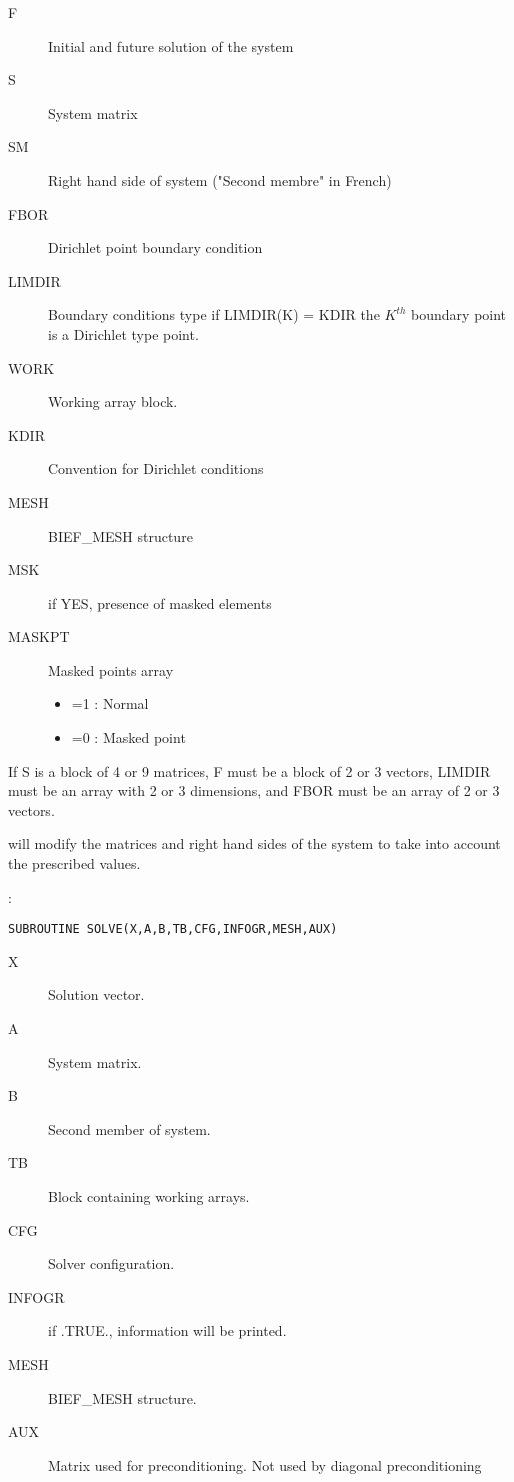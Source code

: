 \begin{description}
  \item [F] Initial and future solution of the system
  \item [S] System matrix
  \item [SM]    Right hand side of system ("Second membre" in French)
  \item [FBOR]  Dirichlet point boundary condition
  \item [LIMDIR] Boundary conditions type if LIMDIR(K) = KDIR the $K^{th}$
    boundary point is a Dirichlet type point.
  \item [WORK] Working array block.
  \item [KDIR] Convention for Dirichlet conditions
  \item [MESH] BIEF\_MESH structure
  \item [MSK] if YES, presence of masked elements
  \item [MASKPT] Masked points array
    \begin{itemize}
      \item =1 : Normal
      \item =0 : Masked point
    \end{itemize}
\end{description}

If S is a block of 4 or 9 matrices, F must be a block of 2 or 3 vectors, LIMDIR
must be an array with 2 or 3 dimensions, and FBOR must be an array of 2 or 3
vectors.

 will modify the matrices and right hand sides of the system to
take into account the prescribed values.

:
\begin{lstlisting}[language=TelFortran]
SUBROUTINE SOLVE(X,A,B,TB,CFG,INFOGR,MESH,AUX)
\end{lstlisting}

\begin{description}
  \item [X] Solution vector.
  \item [A] System matrix.
  \item [B] Second member of system.
  \item [TB] Block containing working arrays.
  \item [CFG] Solver configuration.
  \item [INFOGR] if .TRUE., information will be printed.
  \item [MESH] BIEF\_MESH structure.
  \item [AUX] Matrix used for preconditioning. Not used by diagonal
    preconditioning
\end{description}

